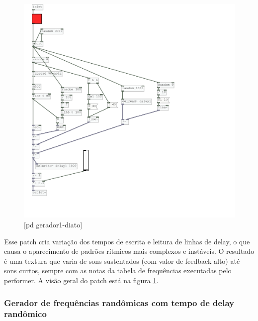 \documentclass{ppgmus}
\begin{document}
\begin{figure}
\includegraphics[scale=.6]{gerador-sintese1-diato}
\caption{[pd gerador1-diato]}
\label{gerador1diato}
\end{figure}


Esse patch cria variação dos tempos de escrita e leitura de linhas de delay, o que causa o
aparecimento de padrões rítmicos mais complexos e instáveis.
O resultado é uma textura que varia de sons sustentados (com valor de feedback alto) até
sons curtos, sempre com as notas da tabela de frequências executadas pelo performer.
A visão geral do patch está na figura \ref{gerador1diato}.


\subsubsection{Gerador de frequências randômicas com tempo de delay randômico}
\end{document}

